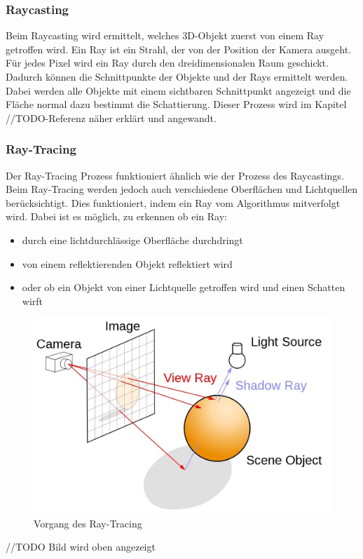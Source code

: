 \subsubsection{Raycasting}
Beim Raycasting wird ermittelt, welches 3D-Objekt zuerst von einem Ray getroffen wird. Ein Ray ist ein Strahl, der von der Position der Kamera ausgeht. Für jedes Pixel wird ein Ray durch den dreidimensionalen Raum geschickt. Dadurch können die Schnittpunkte der Objekte und der Rays ermittelt werden. Dabei werden alle Objekte mit einem sichtbaren Schnittpunkt angezeigt und die Fläche normal dazu bestimmt die Schattierung. Dieser Prozess wird im Kapitel //TODO-Referenz näher erklärt und angewandt.
\cite{Rendering3DModels} 

\subsubsection{Ray-Tracing}
Der Ray-Tracing Prozess funktioniert ähnlich wie der Prozess des Raycastings. Beim Ray-Tracing werden jedoch auch verschiedene Oberflächen und Lichtquellen berücksichtigt. Dies funktioniert, indem ein Ray vom Algorithmus mitverfolgt wird. Dabei ist es möglich, zu erkennen ob ein Ray:
\begin{itemize}
    \item durch eine lichtdurchlässige Oberfläche durchdringt
    \item von einem reflektierenden Objekt reflektiert wird
    \item oder ob ein Objekt von einer Lichtquelle getroffen wird und einen Schatten wirft
\end{itemize}
\cite{RayTracingRasterization}

\begin{figure}
    \centering
    \includegraphics[scale=0.3]{pics/ray-tracing.jpg}
    \caption{Vorgang des Ray-Tracing \cite{RayTracingRasterization}}
    \label{fig:impl:ray-tracing}
\end{figure}
//TODO Bild wird oben angezeigt


